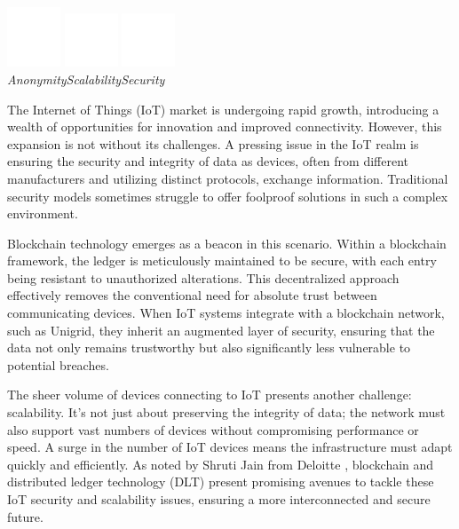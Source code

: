 \documentclass[a4paper,oneside]{article}
\begin{document}
\begin{center}
\includegraphics[width=45pt]{anonymous}
\hspace{1.5cm}
\includegraphics[width=45pt]{scalability}
\hspace{1.5cm}
\includegraphics[width=45pt]{security}
\\
\vspace{0.11cm}
\hspace{0pt}\emph{Anonymity}\hspace{49pt}\emph{Scalability}\hspace{58pt}\emph{Security}\hspace{25pt}
\end{center}

\noindent The Internet of Things (IoT) market is undergoing rapid growth, introducing a wealth of opportunities for innovation and improved connectivity. However, this expansion is not without its challenges. A pressing issue in the IoT realm is ensuring the security and integrity of data as devices, often from different manufacturers and utilizing distinct protocols, exchange information. Traditional security models sometimes struggle to offer foolproof solutions in such a complex environment.

Blockchain technology emerges as a beacon in this scenario. Within a blockchain framework, the ledger is meticulously maintained to be secure, with each entry being resistant to unauthorized alterations. This decentralized approach effectively removes the conventional need for absolute trust between communicating devices. When IoT systems integrate with a blockchain network, such as Unigrid, they inherit an augmented layer of security, ensuring that the data not only remains trustworthy but also significantly less vulnerable to potential breaches.

\noindent The sheer volume of devices connecting to IoT presents another challenge: scalability. It's not just about preserving the integrity of data; the network must also support vast numbers of devices without compromising performance or speed. A surge in the number of IoT devices means the infrastructure must adapt quickly and efficiently. As noted by Shruti Jain from Deloitte \cite{jain2021}, blockchain and distributed ledger technology (DLT) present promising avenues to tackle these IoT security and scalability issues, ensuring a more interconnected and secure future.
\end{document}

